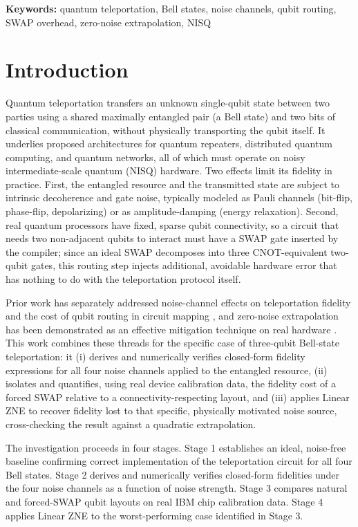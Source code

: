 \documentclass[11pt]{article}
\begin{document}
\vspace{0.5em}
\noindent\textbf{Keywords:} quantum teleportation, Bell states, noise channels, qubit routing, SWAP overhead, zero-noise extrapolation, NISQ

\section{Introduction}

Quantum teleportation \citep{bennett1993} transfers an unknown single-qubit state between two parties using a shared maximally entangled pair (a Bell state) and two bits of classical communication, without physically transporting the qubit itself. It underlies proposed architectures for quantum repeaters, distributed quantum computing, and quantum networks, all of which must operate on noisy intermediate-scale quantum (NISQ) hardware. Two effects limit its fidelity in practice. First, the entangled resource and the transmitted state are subject to intrinsic decoherence and gate noise, typically modeled as Pauli channels (bit-flip, phase-flip, depolarizing) or as amplitude-damping (energy relaxation). Second, real quantum processors have fixed, sparse qubit connectivity, so a circuit that needs two non-adjacent qubits to interact must have a SWAP gate inserted by the compiler; since an ideal SWAP decomposes into three CNOT-equivalent two-qubit gates, this routing step injects additional, avoidable hardware error that has nothing to do with the teleportation protocol itself.

Prior work has separately addressed noise-channel effects on teleportation fidelity \citep{oh2002,usher2017} and the cost of qubit routing in circuit mapping \citep{hillmich2021,pina2025}, and zero-noise extrapolation has been demonstrated as an effective mitigation technique on real hardware \citep{sohn2025,nielsen2002,rindell2023}. This work combines these threads for the specific case of three-qubit Bell-state teleportation: it (i) derives and numerically verifies closed-form fidelity expressions for all four noise channels applied to the entangled resource, (ii) isolates and quantifies, using real device calibration data, the fidelity cost of a forced SWAP relative to a connectivity-respecting layout, and (iii) applies Linear ZNE to recover fidelity lost to that specific, physically motivated noise source, cross-checking the result against a quadratic extrapolation.

The investigation proceeds in four stages. Stage 1 establishes an ideal, noise-free baseline confirming correct implementation of the teleportation circuit for all four Bell states. Stage 2 derives and numerically verifies closed-form fidelities under the four noise channels as a function of noise strength. Stage 3 compares natural and forced-SWAP qubit layouts on real IBM chip calibration data. Stage 4 applies Linear ZNE to the worst-performing case identified in Stage 3.
\end{document}
